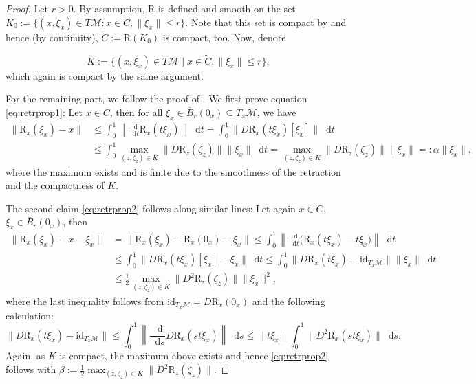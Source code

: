 \documentclass[a4paper, 12pt]{article}
\newcommand*\diff{\mathop{}\!\mathrm{d}}
\numberwithin{equation}{section}
\theoremstyle{bolddef}
\theoremstyle{definition}
\theoremstyle{boldplain}
\newcommand{\clball}{\overline{B}}
\newcommand{\retr}{\mathrm{R}}
\begin{document}
\begin{proof}
	Let $r>0$. By assumption, $\retr$ is defined and smooth on the set $K_0 := \{(x, \xi_x) \in T\mathcal{M}: x \in C, \|\xi_x\|\leq r\}$. Note that this set is compact by \cite[Lemma C.8]{levin2023} and hence (by continuity), $\tilde C := \retr(K_0)$ is compact, too. Now, denote

	\begin{equation}\label{eq:defkset}
		K:=\{(x, \xi_x) \in T\mathcal{M} \mid x \in \tilde C, \|\xi_x\| \leq r\},
	\end{equation}
	which again is compact by the same argument.

For the remaining part, we follow the proof of \cite[Lemma 2.7]{Boumal2018}. We first prove equation \eqref{eq:retrprop1}: Let $x \in C$, then for all $\xi_x \in \clball_r(0_x) \subseteq T_x \mathcal{M}$, we have
	\begin{align*}
		\|\retr_x(\xi_x)-x\| &\leq \int_0^1 \left\| \frac{\diff}{\diff t} \retr_x(t \xi_x) \right\| \diff t = \int_0^1 \|D\retr_x(t \xi_x)[\xi_x]\|\diff t \\
		& \leq \int_0^1 \max_{(z, \zeta_z) \in K} \|D\retr_z(\zeta_z)\| \|\xi_x\| \diff t = \max_{(z, \zeta_z) \in K} \|D\retr_z(\zeta_z)\|\|\xi_x\| =: \alpha \|\xi_x\|,
	\end{align*}
	where the maximum exists and is finite due to the smoothness of the retraction and the compactness of $K$.

	The second claim \eqref{eq:retrprop2} follows along similar lines: Let again $x \in C$, $\xi_x \in \clball_r(0_x)$, then
	\begin{align*}
		\|\retr_x(\xi_x) - x - \xi_x \| & = \|\retr_x(\xi_x) - \retr_x(0_x) - \xi_x \| \leq \int_0^1 \left\|\frac{\diff}{\diff t} \Big(\retr_x(t \xi_x) - t\xi_x\Big) \right\| \diff t \\
		& \leq \int_0^1 \|D \retr_x(t \xi_x)[\xi_x] - \xi_x\|\diff t \leq \int_0^1 \|D \retr_x(t \xi_x) - \mathrm{id}_{T_x \mathcal{M}}\| \|\xi_x\| \diff t\\
		&\leq \frac{1}{2} \max_{(z, \zeta_z) \in K} \| D^2 \retr_z (\zeta_z)\| \|\xi_x\|^2,
	\end{align*}
	where the last inequality follows from $\mathrm{id}_{T_x \mathcal{M}} = D\retr_x(0_x)$ and the following calculation:
	\begin{equation*}
		\|D\retr_x(t\xi_x) - \mathrm{id}_{T_x\mathcal{M}}\| \leq \int_0^1 \left\| \frac{\diff}{\diff s} D\retr_x(s t \xi_x) \right\| \diff s \leq \|t \xi_x\| \int_0^1 \| D^2 \retr_x(st\xi_x)\| \diff s.
	\end{equation*}
	Again, as $K$ is compact, the maximum above exists and hence \eqref{eq:retrprop2} follows with $\beta:= \frac{1}{2} \max_{(z, \zeta_z) \in K} \| D^2 \retr_z (\zeta_z)\|$.
\end{proof}
\end{document}
